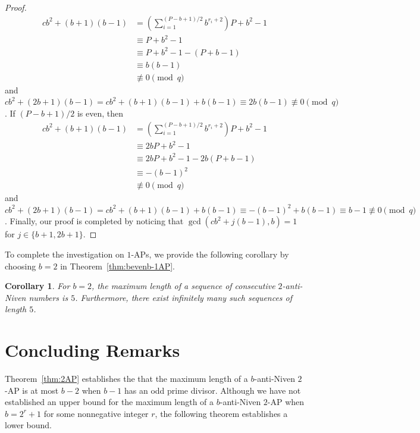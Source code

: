 \documentclass[12pt]{article}
\newtheorem{corollary}[theorem]{Corollary}
\theoremstyle{definition}
\begin{document}
\begin{proof}
\begin{align*}
    cb^2+(b+1)(b-1)&=\left(\sum_{i=1}^{(P-b+1)/2}b^{r_i+2}\right)P+b^2-1\\
    &\equiv P+b^2-1\\
    &\equiv P+b^2-1-(P+b-1)\\
    &\equiv b(b-1)\\
    &\not\equiv0\pmod{q}
\end{align*}
and $cb^2+(2b+1)(b-1)=cb^2+(b+1)(b-1)+b(b-1)\equiv2b(b-1)\not\equiv0\pmod{q}$. If $(P-b+1)/2$ is even, then 
\begin{align*}
    cb^2+(b+1)(b-1)
    &=\left(\sum_{i=1}^{(P-b+1)/2}b^{r_i+2}\right)P+b^2-1\\
    &\equiv 2bP+b^2-1\\
    &\equiv 2bP+b^2-1-2b(P+b-1)\\
    &\equiv-(b-1)^2\\
    &\not\equiv0\pmod{q}
\end{align*}
and $cb^2+(2b+1)(b-1)=cb^2+(b+1)(b-1)+b(b-1)\equiv-(b-1)^2+b(b-1)\equiv b-1\not\equiv0\pmod{q}$. Finally, our proof is completed by noticing that $\gcd(cb^2+j(b-1),b)=1$ for $j\in\{b+1,2b+1\}$.
\end{proof}

To complete the investigation on $1$-APs, we provide the following corollary by choosing $b=2$ in Theorem~\ref{thm:bevenb-1AP}.

\begin{corollary}\label{cor:b=2,1AP}
For $b=2$, the maximum length of a sequence of consecutive $2$-anti-Niven numbers is $5$. Furthermore, there exist infinitely many such sequences of length $5$.
\end{corollary}





\section{Concluding Remarks}\label{sec:conclusion}

Theorem~\ref{thm:2AP} establishes the that the maximum length of a $b$-anti-Niven $2$-AP is at most $b-2$ when $b-1$ has an odd prime divisor.  Although we have not established an upper bound for the maximum length of a $b$-anti-Niven $2$-AP when $b=2^r+1$ for some nonnegative integer $r$, the following theorem establishes a lower bound.
\end{document}
